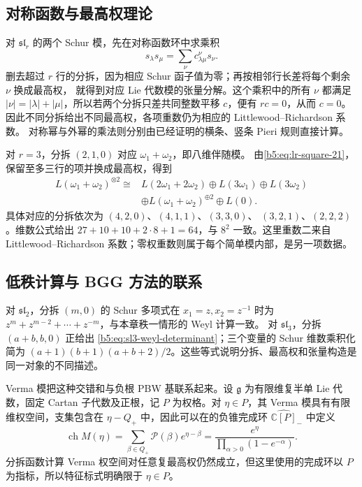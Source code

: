 \subsection{对称函数与最高权理论}
\label{b5:subsec:1906:03}

对 \(\mathfrak{sl}_r\) 的两个 Schur 模，先在对称函数环中求乘积
\[
	s_\lambda s_\mu=\sum_\nu c_{\lambda\mu}^{\nu}s_\nu.
\]
删去超过 \(r\) 行的分拆，因为相应 Schur 函子值为零；再按相邻行长差将每个剩余 \(\nu\) 换成最高权， 就得到对应 Lie 代数模的张量分解。这个乘积中的所有 \(\nu\) 都满足 \(|\nu|=|\lambda|+|\mu|\)，所以若两个分拆只差共同整数平移 \(c\)，便有 \(rc=0\)，从而 \(c=0\)。因此不同分拆给出不同最高权，各项重数仍为相应的 Littlewood--Richardson 系数。 对称幂与外幂的乘法则分别由已经证明的横条、竖条 Pieri 规则直接计算。

\begin{example}\label{b5:exm:sl3-adjoint-square}
	对 \(r=3\)，分拆 \((2,1,0)\) 对应 \(\omega_1+\omega_2\)，即八维伴随模。 由\eqref{b5:eq:lr-square-21}，保留至多三行的项并换成最高权，得到
	\[
		\begin{aligned}
			L(\omega_1+\omega_2)^{\otimes2} \cong{}& L(2\omega_1+2\omega_2)\oplus L(3\omega_1)\oplus L(3\omega_2)\\
			&\oplus L(\omega_1+\omega_2)^{\oplus2}\oplus L(0).
		\end{aligned}
	\]
	具体对应的分拆依次为 \((4,2,0)\)、\((4,1,1)\)、\((3,3,0)\)、 \((3,2,1)\)、\((2,2,2)\)。维数公式给出 \(27+10+10+2\cdot8+1=64\)，与 \(8^2\) 一致。这里重数二来自 Littlewood--Richardson 系数；零权重数则属于每个简单模内部，是另一项数据。
\end{example}

\subsection{低秩计算与 BGG 方法的联系}
\label{b5:subsec:1906:04}

对 \(\mathfrak{sl}_2\)，分拆 \((m,0)\) 的 Schur 多项式在 \(x_1=z,x_2=z^{-1}\) 时为 \(z^m+z^{m-2}+\cdots+z^{-m}\)，与本章秩一情形的 Weyl 计算一致。 对 \(\mathfrak{sl}_3\)，分拆 \((a+b,b,0)\) 正给出 \eqref{b5:eq:sl3-weyl-determinant}；三个变量的 Schur 维数乘积化简为 \((a+1)(b+1)(a+b+2)/2\)。这些等式说明分拆、最高权和张量构造是同一对象的不同描述。

\ProseParagraphBreak
Verma 模把这种交错和与负根 PBW 基联系起来。设 \(\mathfrak g\) 为有限维复半单 Lie 代数，固定 Cartan 子代数及正根，记 \(P\) 为权格。对 \(\eta\in P\)，其 Verma 模具有有限维权空间，支集包含在 \(\eta-Q_+\) 中，因此可以在的负锥完成环 \(\widehat{\mathbb C[P]}_-\) 中定义
\[
	\operatorname{ch}M(\eta) =\sum_{\beta\in Q_+}\mathcal P(\beta)e^{\eta-\beta} =\frac{e^\eta}{\prod_{\alpha>0}(1-e^{-\alpha})}.
\]
分拆函数计算 Verma 权空间对任意复最高权仍然成立，但这里使用的完成环以 \(P\) 为指标，所以特征标式明确限于 \(\eta\in P\)。

